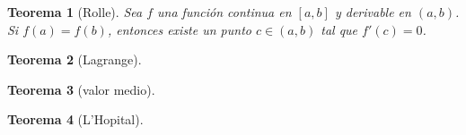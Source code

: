 \documentclass{report}
\newtheorem*{theorem}{Teorema}
\begin{document}
    \begin{theorem}[Rolle]
      Sea $f$ una función continua en $[a,b]$ y derivable en $(a,b)$. Si $f(a)=f(b)$,
      entonces existe un punto $c\in(a,b)$ tal que $f'(c)=0$.
    \end{theorem}
    \begin{theorem}[Lagrange]
    \end{theorem}
    \begin{theorem}[valor medio]
    \end{theorem}
    \begin{theorem}[L'Hopital]
    \end{theorem}
\end{document}
